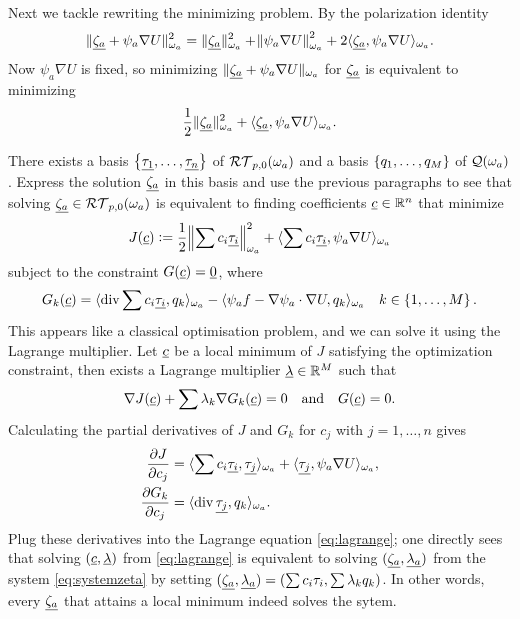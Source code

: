 \documentclass[thesis.tex]{subfiles}
\begin{document}
  Next we tackle rewriting the minimizing problem. By the polarization identity
  \[
    \| \underline{\zeta_a} + \psi_a \nabla U \|_{\omega_a}^2 = \| \underline{\zeta_a} \|_{\omega_a}^2 + \norm{\psi_a \nabla U}^2_{\omega_a} + 2 \langle \underline{\zeta_a}, \psi_a \nabla 
    U \rangle_{\omega_a}.
  \]
  Now $\psi_a \nabla U$ is fixed,  so minimizing $\| \underline{\zeta_a} + \psi_a \nabla U \|_{\omega_a}$ for $\underline{\zeta_a}$ is equivalent to minimizing
  \[
    \frac{1}{2} \| \underline{\zeta_a} \|^2_{\omega_a} + \langle \underline{\zeta_a}, \psi_a \nabla U \rangle_{\omega_a}.
  \]

There exists a basis $\set{\underline{\tau_1},\dots, \underline{\tau_n}}$ of $\mathcal{RT}_{p,0}(\omega_a)$ and
  a basis $\set{q_1, \dots, q_M}$ of $\mathcal{Q}(\omega_a)$. Express the solution $\underline{\zeta_a}$ in this basis  and use the previous paragraphs
  to  see that solving $\underline{\zeta_a} \in \mathcal{RT}_{p,0}(\omega_a)$ is
  equivalent to finding coefficients $\underline{c} \in \mathbb{R}^n$ that minimize 
  \[
    J(\underline{c}) := \frac{1}{2} \norm{\sum c_i \underline{\tau_i}}^2_{\omega_a} + \langle \sum c_i \underline{\tau_i}, \psi_a \nabla U \rangle_{\omega_a}
  \]
  subject to the constraint $G(\underline{c}) = \underline{0}$, where
  \[
    G_k(\underline{c}) = \langle \operatorname{div} \sum c_i \underline{\tau_i}, q_k \rangle_{\omega_a} - \langle \psi_a f - \nabla \psi_a \cdot \nabla U, q_k \rangle_{\omega_a}  \quad k \in \set{1, \dots, M}.
  \]
  This appears like a classical optimisation problem, and we can solve it using the Lagrange multiplier. 
  Let $\underline{c}$ be a local minimum of $J$ satisfying the optimization constraint, then
  exists a Lagrange multiplier $\underline{\lambda} \in \mathbb{R}^{M}$ such that 
   \begin{equation}
     \label{eq:lagrange}
     \nabla J(\underline{c}) + \sum \lambda_k \nabla G_k(\underline{c}) = 0\quad \text{and} \quad G(\underline{c}) = 0.
   \end{equation}
   Calculating the partial derivatives of $J$ and $G_k$ for $c_j$ with $j=1,\dots, n$ gives
   \begin{align*}
     \frac{\partial J}{\partial c_j} &= \langle  \sum c_i \underline{\tau_i}, \underline{\tau_j} \rangle_{\omega_a} + \langle \underline{\tau_j}, \psi_a \nabla U \rangle_{\omega_a},\\
     \frac{\partial G_k}{\partial c_j} &= \langle \operatorname{div} \underline{\tau_j}, q_k \rangle_{\omega_a}.
   \end{align*}
   Plug these derivatives into the Lagrange equation \eqref{eq:lagrange}; one directly sees that
   solving $(\underline{c}, \underline{\lambda})$ from \eqref{eq:lagrange} is equivalent to solving $(\underline{\zeta_a}, \underline{\lambda_a})$ from
   the system \eqref{eq:systemzeta} by setting $(\underline{\zeta_a},{\underline{\lambda_a}}) = (\sum c_i \tau_i, \sum \lambda_k q_k)$.
   In other words, every $\underline{\zeta_a}$ that attains a local minimum indeed solves the sytem.
\end{document}
